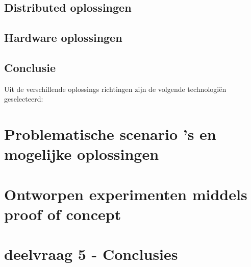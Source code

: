 \subsection{Distributed oplossingen}
\label{sec:distributed}

\clearpage

\subsection{Hardware oplossingen}
\label{sec:hardware}

\clearpage

\subsection{Conclusie}
\label{sec:gevonden_tools}

Uit de verschillende oplossings richtingen zijn de volgende technologiën geselecteerd:




\clearpage

\section{Problematische scenario 's en mogelijke oplossingen}
\label{sec:deelvraag3}

\clearpage




\section{Ontworpen experimenten middels proof of concept}
\label{sec:deelvraag4}

\clearpage

\section{deelvraag 5 - Conclusies}
\label{sec:deelvraag5}


